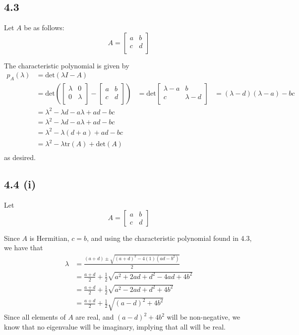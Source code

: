 \documentclass[letterpaper,12pt]{article}
\theoremstyle{definition}
\begin{document}
\subsection*{4.3}
Let $A$ be as follows:
\[A = 
\begin{bmatrix}
    a & b \\
    c & d \\
\end{bmatrix}
\]


The characteristic polynomial is given by 
\begin{align*}
p_A(\lambda) &= \text{det}(\lambda I - A)\\
&= \text{det} \left(
\begin{bmatrix}
    \lambda & 0 \\
    0 & \lambda \\
\end{bmatrix}
- 
\begin{bmatrix}
    a & b \\
    c & d \\
\end{bmatrix}\right)
&=
\text{det}
\begin{bmatrix}
    \lambda-a & b \\
    c & \lambda-d \\
\end{bmatrix}
&= (\lambda-d)(\lambda-a) - bc \\
&= \lambda^2 - \lambda d - a\lambda + ad - bc\\
&= \lambda^2 - \lambda d - a\lambda + ad - bc\\
&= \lambda^2 - \lambda(d + a) + ad - bc\\
&= \lambda^2 - \lambda \text{tr}(A) + \text{det}(A)\\
\end{align*}
as desired.

\subsection*{4.4 (i)}
Let 
\[A =
\begin{bmatrix}
   a & b \\ 
   c & d
\end{bmatrix}  \]

Since $A$ is Hermitian, $c=b$, and using the characteristic polynomial found in 4.3, we have that
\begin{align*}
 \lambda &= \frac{(a+d) \pm \sqrt{(a+d)^2 - 4(1)(ad-b^2)    }   }{    2} \\&= \frac{a+d}{2}+\frac{1}{2}\sqrt{a^2 + 2ad + d^2 -4ad + 4b^2} \\&= \frac{a+d}{2}+\frac{1}{2}\sqrt{a^2 - 2ad + d^2 + 4b^2 } \\&= \frac{a+d}{2}+\frac{1}{2}\sqrt{(a-d)^2 + 4b^2  }
\end{align*}
 Since all elements of $A$ are real, and $(a-d)^2 + 4b^2 $ will be non-negative, we know that no eigenvalue will be imaginary, implying that all will be real. 
\end{document}
